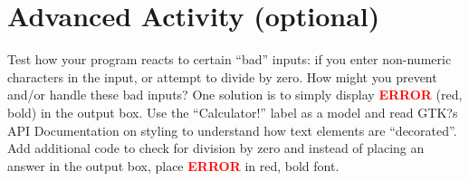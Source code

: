 \documentclass[12pt]{scrartcl}
\begin{document}
\section{Advanced Activity (optional)}

Test how your program reacts to certain ``bad'' inputs: if you enter 
non-numeric characters in the input, or attempt to divide by zero.  
How might you prevent and/or handle these bad inputs?  One 
solution is to simply display \textbf{\textcolor{red}{ERROR}} (red, 
bold) in the output box.  Use the ``Calculator!'' label as a model 
and read GTK?s API Documentation on styling to understand 
how text elements are ``decorated''.  Add additional code to 
check for division by zero and instead of placing an answer in 
the output box, place \textbf{\textcolor{red}{ERROR}} in red, bold font.

	
\end{document}
